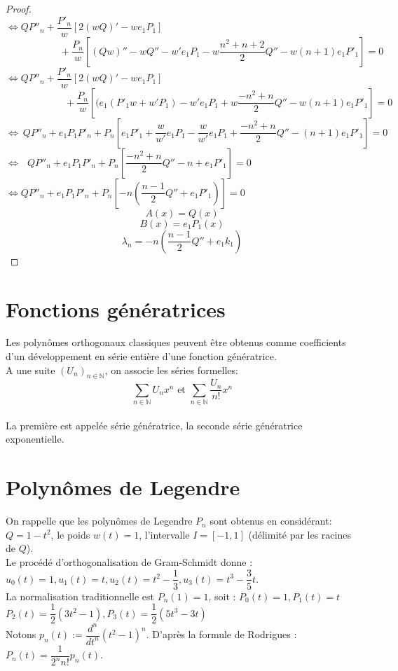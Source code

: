 \begin{proof}
\\$\Leftrightarrow Q{P''}_{n}+\dfrac{{P'}_{n}}{w}[2(wQ)'-we_{1}P_{1}]$
\\$\phantom{11111111111}+\dfrac{P_{n}}{w}\left[(Qw)''-wQ''-w'e_{1}P_{1}-w\dfrac{n^{2}+n+2}{2}Q''-w(n+1)e_{1}{P'}_{1}\right] = 0$
\\$\Leftrightarrow Q{P''}_{n}+\dfrac{{P'}_{n}}{w}[2(wQ)'-we_{1}P_{1}]$
\\$\phantom{111111111111}+\dfrac{P_{n}}{w}\left[(e_{1}({P'}_{1}w+w'P_{1})-w'e_{1}P_{1}+w\dfrac{-n^{2}+n}{2}Q''-w(n+1)e_{1}{P'}_{1} \right] = 0$
\\$\Leftrightarrow \ Q{P''}_{n}+e_{1}P_{1}{P'}_{n}+P_{n}\left[e_{1}{P'}_{1}+\dfrac{w}{w'}e_{1}P_{1}-\dfrac{w}{w'}e_{1}P_{1}+\dfrac{-n^{2}+n}{2}Q''-(n+1)e_{1}{P'}_{1}\right] = 0$
\\$\Leftrightarrow \ \ \ Q{P''}_{n}+e_{1}P_{1}{P'}_{n}+P_{n}\left[\dfrac{-n^{2}+n}{2}Q''-n+e_{1}{P'}_{1}\right] = 0$
\\$\Leftrightarrow Q{P''}_{n}+e_{1}P_{1}{P'}_{n}+P_{n}\left[-n(\dfrac{n-1}{2}Q''+e_{1}{P'}_{1})\right] = 0$
$$A(x)=Q(x)$$
$$B(x)=e_{1}P_{1}(x)$$
$$\lambda_{n}=-n \left(\dfrac{n-1}{2}Q''+e_{1}k_{1}\right)$$
\end{proof}

\section{Fonctions génératrices}
Les polynômes orthogonaux classiques peuvent être obtenus comme coefficients d'un développement en série entière d'une fonction génératrice.
\bdfn
$ $\\A une suite $(U_n)_{n\in\mathbb{N}}$, on associe les séries formelles:
$$\sum_{n\in\mathbb{N}} U_n x^{n} \text{ et } \sum_{n\in\mathbb{N}}\dfrac{U_n}{n!} x^{n}$$
\\La première est appelée série génératrice, la seconde série génératrice exponentielle.
\edfn

\section{Polynômes de Legendre}
On rappelle que les polynômes de Legendre $P_{n}$ sont obtenus en considérant: \\$Q=1-t^{2}$, le poids $w(t)=1$, l'intervalle $I=[-1, 1]$ (délimité par les racines de $Q$). 
\\Le procédé d'orthogonalisation de Gram-Schmidt donne : \\$u_{0}(t)=1, u_{1}(t)=t, u_{2}(t)=t^{2}-\dfrac{1}{3}, u_{3}(t)=t^{3}-\dfrac{3}{5}t$.
\\La normalisation traditionnelle est $P_{n}(1)=1 $, soit : $P_{0}(t)=1, P_{1}(t)=t$
\\$P_{2}(t)=\dfrac{1}{2}(3t^{2}-1), P_{3}(t)=\dfrac{1}{2}(5t^{3}-3t)$
\\Notons $p_{n}(t):=\dfrac{d^{n}}{dt^{n}}(t^{2}-1)^{n}$. D'après la formule de Rodrigues : $P_{n}(t)=\dfrac{1}{2^{n}n!}p_{n}(t)$.

